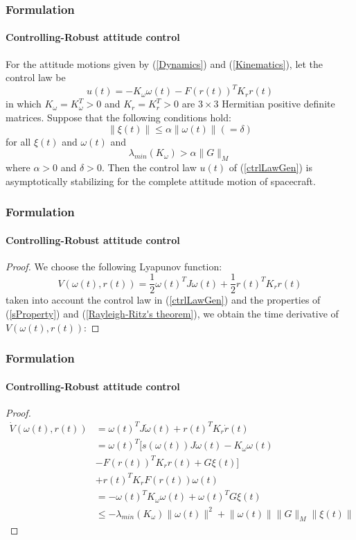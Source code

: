 \documentclass{beamer}
\begin{document}
\begin{frame}
\frametitle{Formulation}
\framesubtitle{Controlling-Robust attitude control}
\begin{theorem}[1]
	For the attitude motions given by (\ref{Dynamics}) and (\ref{Kinematics}), let the control law be
	\begin{equation} \label{ctrlLawGen}
	u(t)=-K_{\omega}\omega(t)-F(r(t))^{T}K_{r}r(t)
	\end{equation}
	in which $K_{\omega}=K_{\omega}^{T}>0$ and $K_{r}=K_{r}^{T}>0$ are $3\times3$ Hermitian positive definite matrices. Suppose that the following conditions hold:
	\begin{equation}\label{disturbanceUpperBound}
	\lVert \xi(t)\rVert\leq\alpha\lVert\omega(t)\rVert(=\delta)
	\end{equation}
	for all $\xi(t)$ and $\omega(t)$ and
	\begin{equation}\label{feedbackGainCondition}
	\lambda_{min}(K_{\omega})>\alpha\lVert G\rVert_{M}
	\end{equation}
	 where $\alpha>0$ and $\delta>0$. Then the control law $u(t)$ of (\ref{ctrlLawGen}) is asymptotically stabilizing for the complete attitude motion of spacecraft. 
\end{theorem}
\end{frame}

\begin{frame}
\frametitle{Formulation}
\framesubtitle{Controlling-Robust attitude control}
\begin{proof}
	We choose the following Lyapunov function:
	\begin{equation}\label{Lyapunov}
	V(\omega(t),r(t))=\frac{1}{2}\omega(t)^{T}J\omega(t)+\frac{1}{2}r(t)^{T}K_{r}r(t)
	\end{equation}
	taken into account the control law in (\ref{ctrlLawGen}) and the properties of (\ref{sProperty}) and (\ref{Rayleigh-Ritz's theorem}), we obtain the time derivative of $V(\omega(t),r(t))$:
\end{proof}
\end{frame}

\begin{frame}
\frametitle{Formulation}
\framesubtitle{Controlling-Robust attitude control}
\begin{proof}
	\begin{equation}\label{timeDerivative}
	\begin{split}
	\dot{V}({\omega}(t),r(t))&=\omega(t)^{T}J{\dot{\omega}(t)}+r(t)^{T}K_{r}\dot{r}(t)\\
	&=\omega(t)^{T}\biggl[s(\omega(t))J\omega(t)-K_{\omega}\omega(t)\\
	&-F(r(t))^{T}K_{r}r(t)+G\xi(t)\biggr]\\
	&+r(t)^{T}K_{r}F(r(t))\omega(t)\\
	&=-\omega(t)^{T}K_{\omega}\omega(t)+\omega(t)^{T}G\xi(t)\\
	&\leq -\lambda_{min}(K_{\omega})\lVert\omega(t)\rVert^{2}+\lVert\omega(t)\rVert\lVert G\rVert_{M}\lVert\xi(t)\rVert
	\end{split}
	\end{equation}
\end{proof}
\end{frame}
\end{document}
